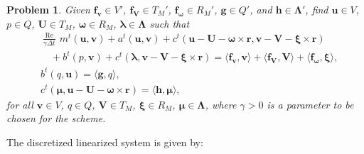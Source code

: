 \documentclass{article}
\newcommand{\bU}{{\mathbf{U}}}
\newcommand{\bu}{{\mathbf{u}}}
\newcommand{\bv}{{\mathbf{v}}}
\newcommand{\bomega}{{\boldsymbol{\omega}}}
\newcommand{\Reynolds}{{\operatorname{Re}}}
\newtheorem{problem}{Problem}
\begin{document}
\begin{problem}
Given ${\mathbf{f}}_\bv\in V'$, ${\mathbf{f}}_\mathbf{V}\in T_M'$, ${\mathbf{f}}_\bomega\in R_M'$, ${\mathbf{g}}\in Q'$, and ${\mathbf{h}}\in \boldsymbol{\Lambda}'$,
find $\bu\in V$, $p\in Q$, $\bU \in T_M$, $\boldsymbol{\omega}\in R_M$, ${\boldsymbol{\lambda}}\in \boldsymbol{\Lambda}$ such that
\begin{equation}\label{eq:linearised_continuous}
    \begin{aligned}
        &\frac{\Reynolds}{\gamma \Delta t}\, {m}^t({\bu}, {\bv}) + {a}^t(\bu,{\bv}) + {c}^t(\bu - {\bU} - \boldsymbol{\omega}\times \mathbf{r},\bv - {\mathbf{V}} - {\boldsymbol{\xi}}\times\mathbf{r}) \\
        &\quad + {b}^t(p, {\bv}) + {c}^t({\boldsymbol{\lambda}}, {\bv} - {\mathbf{V}} - {\boldsymbol{\xi}}\times\mathbf{r}) = \langle{\mathbf{f}}_\bv,{\bv}\rangle + \langle{\mathbf{f}}_\mathbf{V},{\mathbf{V}}\rangle + \langle{\mathbf{f}}_\bomega,{\boldsymbol{\xi}}\rangle, \\
        &{b}^t({q},\bu) = \langle{\mathbf{g}},{q}\rangle, \\
        &{c}^t({\boldsymbol{\mu}},\bu - \bU - \boldsymbol{\omega}\times\mathbf{r})  = \langle{\mathbf{h}},{\boldsymbol{\mu}}\rangle,
    \end{aligned}
\end{equation}
for all ${\bv}\in V$, ${q}\in Q$, ${\mathbf{V}} \in T_M$, ${\boldsymbol{\xi}}\in R_M$, ${\boldsymbol{\mu}}\in \boldsymbol{\Lambda}$, where $\gamma > 0$ is a parameter to be chosen for the scheme.
\end{problem}

The discretized linearized system is given by:
\end{document}
